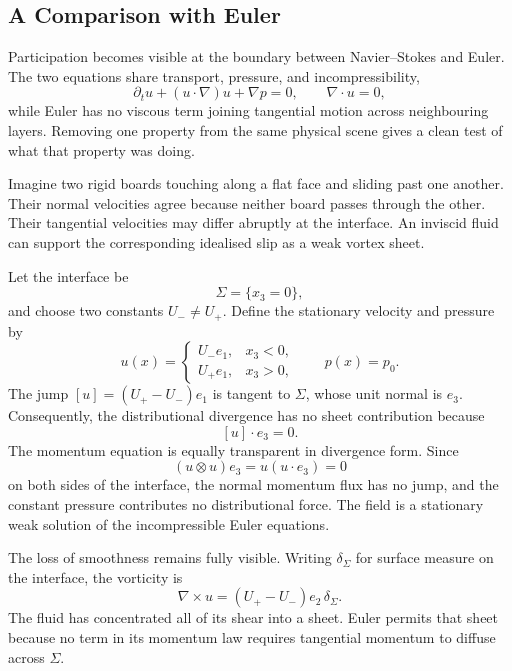 \subsection{A Comparison with Euler}\label{sub:AComparisonWithEuler}

Participation becomes visible at the boundary between Navier--Stokes and Euler.
The two equations share transport, pressure, and incompressibility,
\[
  \partial_tu+(u\cdot\nabla)u+\nabla p=0,
  \qquad
  \nabla\cdot u=0,
\]
while Euler has no viscous term joining tangential motion across neighbouring layers.
Removing one property from the same physical scene gives a clean test of what that property was doing.

Imagine two rigid boards touching along a flat face and sliding past one another.
Their normal velocities agree because neither board passes through the other.
Their tangential velocities may differ abruptly at the interface.
An inviscid fluid can support the corresponding idealised slip as a weak vortex sheet.

Let the interface be
\[
  \Sigma=\{x_3=0\},
\]
and choose two constants \(U_-\neq U_+\).
Define the stationary velocity and pressure by
\[
  u(x)=
  \begin{cases}
    U_-e_1, & x_3<0,\\
    U_+e_1, & x_3>0,
  \end{cases}
  \qquad
  p(x)=p_0.
\]
The jump \( [u]=(U_+-U_-)e_1 \) is tangent to \(\Sigma\), whose unit normal is \(e_3\).
Consequently, the distributional divergence has no sheet contribution because
\[
  [u]\cdot e_3=0.
\]
The momentum equation is equally transparent in divergence form.
Since
\[
  (u\otimes u)e_3=u(u\cdot e_3)=0
\]
on both sides of the interface, the normal momentum flux has no jump, and the constant pressure contributes no distributional force.
The field is a stationary weak solution of the incompressible Euler equations.

The loss of smoothness remains fully visible.
Writing \(\delta_\Sigma\) for surface measure on the interface, the vorticity is
\[
  \nabla\times u
  =
  (U_+-U_-)e_2\,\delta_\Sigma.
\]
The fluid has concentrated all of its shear into a sheet.
Euler permits that sheet because no term in its momentum law requires tangential momentum to diffuse across \(\Sigma\).

